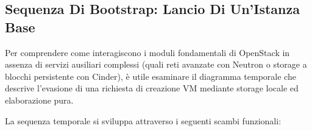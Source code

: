 \documentclass[11pt, a4paper]{article}
\begin{document}
\subsection{Sequenza Di Bootstrap: Lancio Di Un'Istanza Base}

Per comprendere come interagiscono i moduli fondamentali di OpenStack in assenza di servizi ausiliari complessi (quali reti avanzate con Neutron o storage a blocchi persistente con Cinder), è utile esaminare il diagramma temporale che descrive l'evasione di una richiesta di creazione VM mediante storage locale ed elaborazione pura.


La sequenza temporale si sviluppa attraverso i seguenti scambi funzionali:
\end{document}
